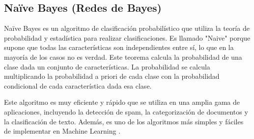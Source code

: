 \doublespacing
\subsection{Naïve Bayes (Redes de Bayes)}
\label{sec:NB}
Naïve Bayes es un algoritmo de clasificación probabilístico que utiliza la teoría de probabilidad y estadística para realizar clasificaciones. Es llamado "Naive" porque supone que todas las características son independientes entre sí, lo que en la mayoría de los casos no es verdad. Este teorema calcula la probabilidad de una clase dada un conjunto de características. La probabilidad se calcula multiplicando la probabilidad a priori de cada clase con la probabilidad condicional de cada característica dada esa clase\cite{Vembandasamy2015}. \\
\par Este algoritmo es muy eficiente y rápido que se utiliza en una amplia gama de aplicaciones, incluyendo la detección de spam, la categorización de documentos y la clasificación de texto. Además, es uno de los algoritmos más simples y fáciles de implementar en Machine Learning \cite{Vembandasamy2015}.\\

